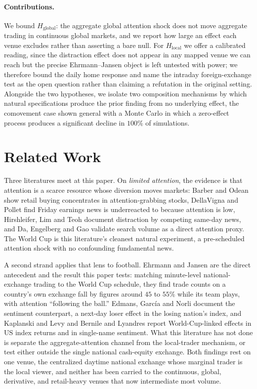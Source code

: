 \documentclass[12pt]{article}
\begin{document}
\paragraph{Contributions.} We bound $H_{\text{global}}$: the aggregate global attention shock does not move aggregate trading in continuous global markets, and we report how large an effect each venue excludes rather than asserting a bare null. For $H_{\text{local}}$ we offer a calibrated reading, since the distraction effect does not appear in any mapped venue we can reach but the precise Ehrmann--Jansen object is left untested with power; we therefore bound the daily home response and name the intraday foreign-exchange test as the open question rather than claiming a refutation in the original setting. Alongside the two hypotheses, we isolate two composition mechanisms by which natural specifications produce the prior finding from no underlying effect, the comovement case shown general with a Monte Carlo in which a zero-effect process produces a significant decline in $100\%$ of simulations.

\section{Related Work}\label{sec:related}
Three literatures meet at this paper. On \emph{limited attention}, the evidence is that attention is a
scarce resource whose diversion moves markets: Barber and Odean
\cite{barber2008} show retail buying concentrates in attention-grabbing stocks, DellaVigna and Pollet
\cite{dellavigna2009} find Friday earnings news is underreacted to because attention is low, Hirshleifer,
Lim and Teoh \cite{hirshleifer2009} document distraction by competing same-day news, and Da, Engelberg and
Gao \cite{da2011} validate search volume as a direct attention proxy. The World Cup is this literature's
cleanest natural experiment, a pre-scheduled attention shock with no confounding fundamental news.

A second strand applies that lens to football. Ehrmann and Jansen
\cite{ehrmann2017} are the direct antecedent and the result this paper tests: matching minute-level
national-exchange trading to the World Cup schedule, they find trade counts on a country's own exchange
fall by figures around $45$ to $55\%$ while its team plays, with attention ``following the ball.'' Edmans,
Garc\'ia and Norli \cite{edmans2007} document the sentiment counterpart, a next-day loser effect in the
losing nation's index, and Kaplanski and Levy \cite{kaplanski2010} and Bernile and Lyandres
\cite{bernile2011} report World-Cup-linked effects in US index returns and in single-name sentiment. What
this literature has not done is separate the aggregate-attention channel from the local-trader mechanism,
or test either outside the single national cash-equity exchange. Both findings rest on one venue, the
centralized daytime national exchange whose marginal trader is the local viewer, and neither has been
carried to the continuous, global, derivative, and retail-heavy venues that now intermediate most volume.
\end{document}
